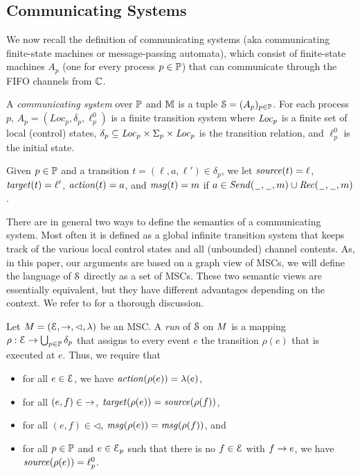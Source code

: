 \documentclass[a4paper,UKenglish,cleveref, autoref, thm-restate]{lipics-v2021}
\begin{document}
\subsection{Communicating Systems}

We now recall the definition of communicating systems (aka communicating finite-state
machines or message-passing automata), which consist of finite-state machines $A_p$
(one for every process $p \in \mathbb{P}$) that can communicate through the FIFO channels
from $\mathbb{C}$.

\begin{definition}\label{def:cs}
A \emph{communicating system} over $\mathbb{P}$ and $\mathbb{M}$ is a tuple
   $ \mathcal{S} = (A_p)_{p\in\mathbb{P}}$. For each
  process $p$, $A_p = (Loc_p, \delta_p, \ell^0_p)$ is a finite transition system where
  $\mathit{Loc}_p$ is a finite set of local (control) states, $\delta_p
  \subseteq \mathit{Loc}_p \times \Sigma_{p} \times \mathit{Loc}_p$ is the
  transition relation, and $\ell^0_p$ is the initial state.
\end{definition}

Given $p \in \mathbb{P}$ and a transition $t = (\ell,a,\ell') \in \delta_p$, we let
$\mathit{source}(t) = \ell$, $\mathit{target}(t) = \ell'$, $\mathit{action}(t) = a$, and
$\mathit{msg}(t) = m$ if $a \in {\mathit{Send}(\hspace{0.1em}\underline{\hspace{0.5em}}\hspace{0.1em},\hspace{0.1em}\underline{\hspace{0.5em}}\hspace{0.1em},m)} \cup {\mathit{Rec}(\hspace{0.1em}\underline{\hspace{0.5em}}\hspace{0.1em},\hspace{0.1em}\underline{\hspace{0.5em}}\hspace{0.1em},m)}$.

\smallskip

There are in general two ways to define the semantics of a communicating system.
Most often it is defined as a global infinite transition system that keeps track
of the various local control states and all (unbounded) channel contents.
As, in this paper, our arguments are based on a graph view of MSCs, we will define
the language of $\mathcal{S}$ directly as a set of MSCs. These two semantic views are essentially
equivalent, but they have different advantages depending on the context.
We refer to \cite{CyriacG14} for a thorough discussion.

Let $M = (\mathcal{E},\to,\lhd,\lambda)$ be an MSC.
A \emph{run} of $\mathcal{S}$ on $M$ is a mapping
$\rho: \mathcal{E} \to \bigcup_{p \in \mathbb{P}} \delta_p$
that assigns to every event $e$ the transition $\rho(e)$
that is executed at $e$. Thus, we require that
\begin{itemize}
\item for all $e \in \mathcal{E}$, we have $\mathit{action}(\rho(e)) = \lambda(e)$,
\item for all $(e,f) \in {\to}$, $\mathit{target}(\rho(e)) = \mathit{source}(\rho(f))$,
\item for all $(e,f) \in {\lhd}$, $\mathit{msg}(\rho(e)) = \mathit{msg}(\rho(f))$,
and
\item for all $p \in \mathbb{P}$ and $e \in \mathcal{E}_p$ such that there is no $f \in \mathcal{E}$ with $f \to e$, we have $\mathit{source}(\rho(e)) = \ell_p^0$.
\end{itemize}
\end{document}
